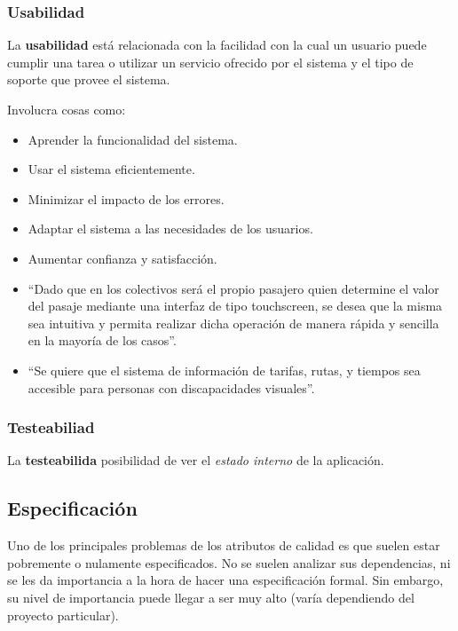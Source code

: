 \documentclass[]{article}
\begin{document}
\subsubsection{Usabilidad}
La \textbf{usabilidad} está relacionada con la facilidad con la cual un usuario puede cumplir una tarea o utilizar un servicio ofrecido por el sistema y el tipo de soporte que provee el sistema.

Involucra cosas como:
\begin{itemize}
	\item Aprender la funcionalidad del sistema.
	\item Usar el sistema eficientemente.
	\item Minimizar el impacto de los errores.
	\item Adaptar el sistema a las necesidades de los usuarios.
	\item Aumentar confianza y satisfacción.
\end{itemize}

\begin{itemize}
	\item ``Dado que en los colectivos será el propio pasajero quien determine el valor del pasaje mediante una interfaz de tipo touchscreen, se desea que la misma sea intuitiva y permita realizar dicha operación de manera rápida y sencilla en la mayoría de los casos''.
	\item ``Se quiere que el sistema de información de tarifas, rutas, y tiempos sea accesible para personas con discapacidades visuales''.
\end{itemize}


\subsubsection{Testeabiliad}
La \textbf{testeabilida} posibilidad de ver el \emph{estado interno} de la aplicación.


\subsection{Especificación}
Uno de los principales problemas de los atributos de calidad es que suelen estar pobremente o nulamente especificados. No se suelen analizar sus dependencias, ni se les da importancia a la hora de hacer una especificación formal. Sin embargo, su nivel de importancia puede llegar a ser muy alto (varía dependiendo del proyecto particular).
\end{document}
